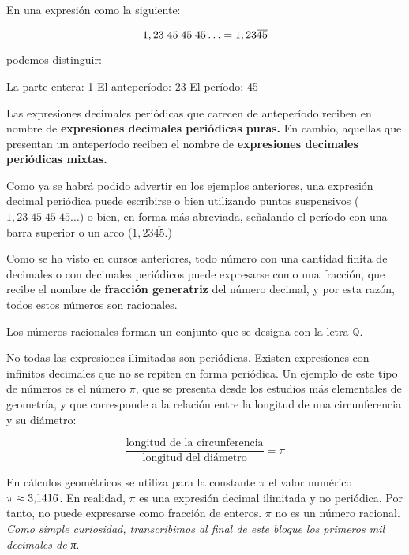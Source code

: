 En una expresión como la siguiente:

{\setlength{\abovedisplayskip}{0ex}
 \[
 1,23\;45\;45\;45\ldots = 1,23\overline{45}
 \]}

podemos distinguir:

\begin{ejemplos}[1][\textbullet]
  \task La parte entera: 1
  \task El anteperíodo: 23
  \task El período: 45
\end{ejemplos}


Las expresiones decimales periódicas que carecen de anteperíodo reciben en nombre de \textbf{expresiones
decimales periódicas puras.}  En cambio, aquellas que presentan un anteperíodo reciben el nombre 
de \textbf{expresiones decimales periódicas mixtas.}

Como ya se habrá podido advertir en los ejemplos anteriores, una expresión decimal periódica puede
escribirse o bien utilizando puntos suspensivos ($1,23\;45\;45\;45\ldots$) o bien, en forma más abreviada,
señalando el período con una barra superior o un arco ($1,23\overline{45}$.)

Como se ha visto en cursos anteriores, todo número con una cantidad finita de decimales o con decimales
periódicos puede expresarse como una fracción, que recibe el nombre de \textbf{fracción generatriz} del 
número decimal, y por esta razón, todos estos números son racionales.
 
\begin{center}
Los números racionales forman un conjunto que se designa con la letra $\mathbb{Q}$.
\end{center}


No todas las expresiones ilimitadas son periódicas. Existen expresiones
con infinitos decimales que no se repiten en forma periódica. Un ejemplo de este tipo de números 
es el número $\pi$, que se presenta desde los estudios más elementales de geometría, y
que corresponde a la relación entre la longitud de una circunferencia y su
diámetro:

\vspace{-1.25ex}
\begin{equation*}
  \dfrac{\text{longitud de la circunferencia}}{\text{longitud del diámetro}} = \pi
\end{equation*}
\vspace{-1ex}

En cálculos geométricos se utiliza para la constante $\pi$  el valor numérico $\pi \approx \numes{3.1416}$.
En realidad, $\pi$ es una expresión decimal ilimitada y no periódica. Por tanto,
no puede expresarse como fracción de enteros. $\pi$ no es un número racional. \textit{Como simple curiosidad, 
transcribimos al final de este bloque los primeros mil decimales de π}.

